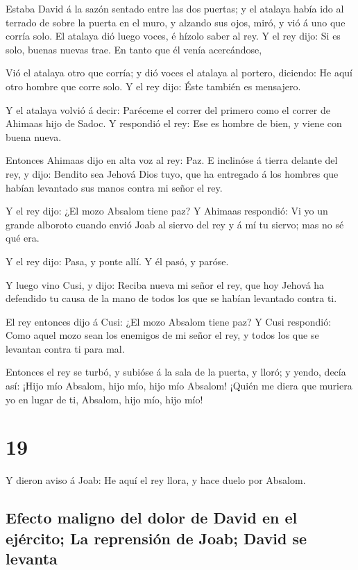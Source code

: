  Estaba David á la sazón sentado entre las dos puertas; y
el atalaya había ido al terrado de sobre la puerta en el muro, y alzando
sus ojos, miró, y vió á uno que corría solo.  El atalaya
dió luego voces, é hízolo saber al rey. Y el rey dijo: Si es solo,
buenas nuevas trae. En tanto que él venía acercándose,

 Vió el atalaya otro que corría; y dió voces el atalaya
al portero, diciendo: He aquí otro hombre que corre solo. Y el rey dijo:
Éste también es mensajero.

 Y el atalaya volvió á decir: Paréceme el correr del
primero como el correr de Ahimaas hijo de Sadoc. Y respondió el rey: Ese
es hombre de bien, y viene con buena nueva.

 Entonces Ahimaas dijo en alta voz al rey: Paz. E
inclinóse á tierra delante del rey, y dijo: Bendito sea Jehová Dios
tuyo, que ha entregado á los hombres que habían levantado sus manos
contra mi señor el rey.

 Y el rey dijo: ¿El mozo Absalom tiene paz? Y Ahimaas
respondió: Vi yo un grande alboroto cuando envió Joab al siervo del rey
y á mí tu siervo; mas no sé qué era.

 Y el rey dijo: Pasa, y ponte allí. Y él pasó, y paróse.

 Y luego vino Cusi, y dijo: Reciba nueva mi señor el rey,
que hoy Jehová ha defendido tu causa de la mano de todos los que se
habían levantado contra ti.

 El rey entonces dijo á Cusi: ¿El mozo Absalom tiene paz?
Y Cusi respondió: Como aquel mozo sean los enemigos de mi señor el rey,
y todos los que se levantan contra ti para mal.

 Entonces el rey se turbó, y subióse á la sala de la
puerta, y lloró; y yendo, decía así: ¡Hijo mío Absalom, hijo mío, hijo
mío Absalom! ¡Quién me diera que muriera yo en lugar de ti, Absalom,
hijo mío, hijo mío!

\hypertarget{section-18}{%
\section{19}\label{section-18}}

 Y dieron aviso á Joab: He aquí el rey llora, y hace duelo
por Absalom.

\hypertarget{efecto-maligno-del-dolor-de-david-en-el-ejuxe9rcito-la-reprensiuxf3n-de-joab-david-se-levanta}{%
\subsection{Efecto maligno del dolor de David en el ejército; La
reprensión de Joab; David se
levanta}\label{efecto-maligno-del-dolor-de-david-en-el-ejuxe9rcito-la-reprensiuxf3n-de-joab-david-se-levanta}}

